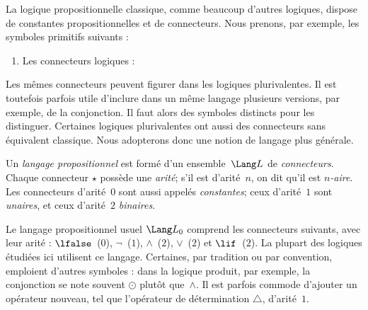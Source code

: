 \documentclass[../../../include/open-logic-section]{subfiles}
\begin{document}


La logique propositionnelle classique,
comme beaucoup d'autres logiques,
dispose de constantes propositionnelles
et de connecteurs. Nous prenons, par
exemple, les symboles primitifs suivants :
\begin{enumerate}
\item Les connecteurs logiques :
  \startycommalist
\end{enumerate}

Les mêmes connecteurs peuvent figurer
dans les logiques plurivalentes. Il
est toutefois parfois utile d'inclure
dans un même langage plusieurs versions,
par exemple, de la conjonction. Il
faut alors des symboles distincts pour
les distinguer. Certaines logiques
plurivalentes ont aussi des connecteurs
sans équivalent classique. Nous adopterons
donc une notion de langage plus générale.

\begin{defn}
Un \emph{langage propositionnel} est
formé d'un ensemble~$\Lang L$ de
\emph{connecteurs}. Chaque connecteur
$\star$ possède une \emph{arité};
s'il est d'arité~$n$, on dit qu'il
est \emph{$n$-aire}. Les connecteurs
d'arité~$0$ sont aussi appelés
\emph{constantes}; ceux d'arité~$1$
sont \emph{unaires}, et ceux d'arité~$2$
\emph{binaires}.
\end{defn}

\begin{ex}
Le langage propositionnel usuel
$\Lang L_0$ comprend les connecteurs
suivants, avec leur arité :
$\lfalse$~($0$),
$\lnot$~($1$),
$\land$~($2$),
$\lor$~($2$) et
$\lif$~($2$).
La plupart des logiques étudiées ici
utilisent ce langage. Certaines,
par tradition ou par convention,
emploient d'autres symboles : dans
la logique produit, par exemple,
la conjonction se note souvent
$\odot$ plutôt que~$\land$.
Il est parfois commode d'ajouter
un opérateur nouveau, tel que
l'opérateur de détermination
$\triangle$, d'arité~$1$.
\end{ex}
\end{document}
